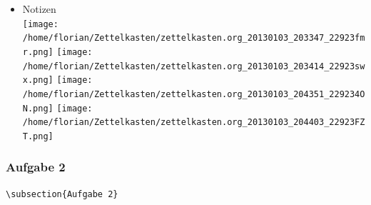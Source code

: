 \documentclass[11pt]{article}
\begin{document}
\begin{itemize}
\begin{verbatim}
Aus Sicht des jeweiligen Spielers befinden sich nun noch 4 - X Karten im Spiel. Für die Karten im Skat gilt
daher das selbe Prinzip wie schon in a), d.h. Binomialverteilung. \\
Sei $\Omega' = \{0,1,2\}$ und somit also die möglichen Anzahlen an Buben im Skat. \\
Analog zu a) ergibt sich für $\mathbb{P}(Y|X = k)$ nun mit für 2 Kartenziehungen und einer Wahrscheinlichkeit
von $\frac{4-X}{32}$ für einen Buben pro Karte:\\
Für $\omega \in \Omega:$ $\mathbb{P}(Y = \omega |X = k) = \binom{32}{\omega}(\frac{4-X}{32})^{\omega} * (1 - \frac{4-X}{32})^{2 - \omega}$
\end{verbatim}

\item Notizen\\
\label{sec-3-8-2-3}%
\texttt{[image: /home/florian/Zettelkasten/zettelkasten.org\_20130103\_203347\_22923fmr.png]}
\texttt{[image: /home/florian/Zettelkasten/zettelkasten.org\_20130103\_203414\_22923swx.png]}
\texttt{[image: /home/florian/Zettelkasten/zettelkasten.org\_20130103\_204351\_229234ON.png]}
\texttt{[image: /home/florian/Zettelkasten/zettelkasten.org\_20130103\_204403\_22923FZT.png]}

\end{itemize} %
\subsubsection{Aufgabe 2}
\label{sec-3-8-3}


\begin{verbatim}
\subsection{Aufgabe 2}
\end{verbatim}
\end{document}
